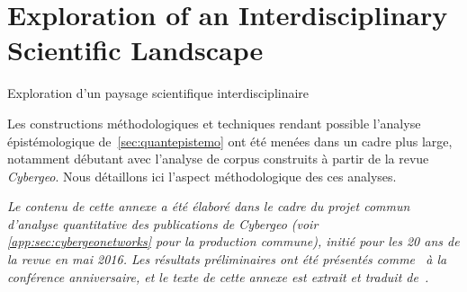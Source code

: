 


\newpage


\section{Exploration of an Interdisciplinary Scientific Landscape}{Exploration d'un paysage scientifique interdisciplinaire}

\label{app:sec:cybergeo}





Les constructions méthodologiques et techniques rendant possible l'analyse épistémologique de~\ref{sec:quantepistemo} ont été menées dans un cadre plus large, notamment débutant avec l'analyse de corpus construits à partir de la revue \textit{Cybergeo}. Nous détaillons ici l'aspect méthodologique des ces analyses.

 
\stars

\textit{Le contenu de cette annexe a été élaboré dans le cadre du projet commun d'analyse quantitative des publications de Cybergeo (voir \ref{app:sec:cybergeonetworks} pour la production commune), initié pour les 20 ans de la revue en mai 2016. Les résultats préliminaires ont été présentés comme~\cite{raimbault2016indirect} à la conférence anniversaire, et le texte de cette annexe est extrait et traduit de~\cite{raimbault2017exploration}.}


\stars





